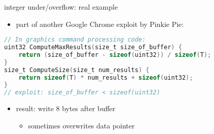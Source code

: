 \usetikzlibrary{calc}

\begin{frame}[fragile,label=intUOEx]{integer under/overflow: real example}
    \begin{itemize}
        \item part of another Google Chrome exploit by Pinkie Pie:
    \end{itemize}
    \begin{lstlisting}[language=C,style=small,morekeywords={uint32,size_t}]
// In graphics command processing code:
uint32 ComputeMaxResults(size_t size_of_buffer) {
    return (size_of_buffer - sizeof(uint32)) / sizeof(T);
} 
size_t ComputeSize(size_t num_results) {
    return sizeof(T) * num_results + sizeof(uint32);
} 
// exploit: size_of_buffer < sizeof(uint32)
\end{lstlisting}
    \begin{itemize}
        \item result: write 8 bytes after buffer 
            \begin{itemize}
                \item sometimes overwrites data pointer
            \end{itemize}
    \end{itemize}
\end{frame}


